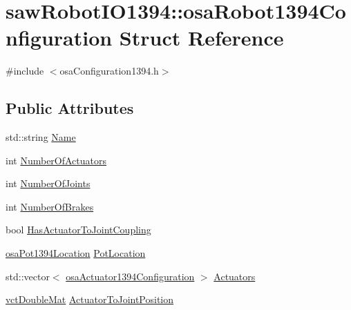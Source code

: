 \hypertarget{structsaw_robot_i_o1394_1_1osa_robot1394_configuration}{}\section{saw\+Robot\+I\+O1394\+:\+:osa\+Robot1394\+Configuration Struct Reference}
\label{structsaw_robot_i_o1394_1_1osa_robot1394_configuration}


{\ttfamily \#include $<$osa\+Configuration1394.\+h$>$}

\subsection*{Public Attributes}
\begin{DoxyCompactItemize}
\item 
std\+::string \hyperlink{structsaw_robot_i_o1394_1_1osa_robot1394_configuration_ad6b0699fb042c74c6b8fad95e2759758}{Name}
\item 
int \hyperlink{structsaw_robot_i_o1394_1_1osa_robot1394_configuration_a05c7f51c9d890b9e0f11cec350bf985d}{Number\+Of\+Actuators}
\item 
int \hyperlink{structsaw_robot_i_o1394_1_1osa_robot1394_configuration_a8f20205cf84b097ff516024f84539171}{Number\+Of\+Joints}
\item 
int \hyperlink{structsaw_robot_i_o1394_1_1osa_robot1394_configuration_a17d68dc07c390a7085ad680422df32bb}{Number\+Of\+Brakes}
\item 
bool \hyperlink{structsaw_robot_i_o1394_1_1osa_robot1394_configuration_ad1fa7199924f9bb6b613e06aa4565548}{Has\+Actuator\+To\+Joint\+Coupling}
\item 
\hyperlink{namespacesaw_robot_i_o1394_a9d63d89648f679b6af5cf3f16576bde9}{osa\+Pot1394\+Location} \hyperlink{structsaw_robot_i_o1394_1_1osa_robot1394_configuration_a5b38595afbffebafba80e01c0bea9bac}{Pot\+Location}
\item 
std\+::vector$<$ \hyperlink{structsaw_robot_i_o1394_1_1osa_actuator1394_configuration}{osa\+Actuator1394\+Configuration} $>$ \hyperlink{structsaw_robot_i_o1394_1_1osa_robot1394_configuration_a1f32b7a5a19e4774370b591cb92d1650}{Actuators}
\item 
\hyperlink{vct_dynamic_matrix_types_8h_a48f1eb2461d20a99e824ee5753a37c84}{vct\+Double\+Mat} \hyperlink{structsaw_robot_i_o1394_1_1osa_robot1394_configuration_ab0eb79678ff7a831df47a83585ee85b3}{Actuator\+To\+Joint\+Position}
\item 

\end{DoxyCompactItemize}
